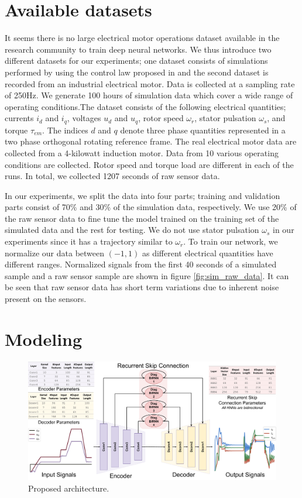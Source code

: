 \documentclass[letterpaper]{article}
\begin{document}
\section{Available datasets}
\label{sec:data}

It seems there is no large electrical motor operations dataset available in the research community to train deep neural networks. We thus introduce two different datasets for our experiments; one dataset consists of simulations performed by using the control law proposed in \cite{jadot2009induct} and the second dataset is recorded from an industrial electrical motor. Data is collected at a sampling rate of 250Hz. We generate 100 hours of simulation data which cover a wide range of operating conditions.The dataset consists of the following electrical quantities; currents $i_{d}$ and $i_{q}$, voltages $u_{d}$ and $u_{q}$, rotor speed $\omega_r$, stator pulsation $\omega_s$, and torque $\tau_{em}$. The indices $d$ and $q$ denote three phase quantities represented in a two phase orthogonal rotating reference frame. The real electrical motor data are collected from a 4-kilowatt induction motor. Data from 10 various operating conditions are collected. Rotor speed and torque load are different in each of the runs. In total, we collected 1207 seconds of raw sensor data.

In our experiments, we split the data into four parts; training and validation parts consist of 70\% and 30\% of the simulation data, respectively. We use 20\% of the raw sensor data to fine tune the model trained on the training set of the simulated data and the rest for testing. We do not use stator pulsation $\omega_s$ in our experiments since it has a trajectory similar to $\omega_r$. To train our network, we normalize our data between $(-1,1)$ as different electrical quantities have different ranges. Normalized signals from the first 40 seconds of a simulated sample and a raw sensor sample are shown in figure \ref{fig:sim_raw_data}. It can be seen that raw sensor data has short term variations due to inherent noise present on the sensors.


\section{Modeling}
\label{sec:modeling}
\begin{figure}[t]
    \centering
    \includegraphics[scale=0.265]{encoder_decoder.pdf}
    \caption{Proposed architecture.}
    \label{fig:arch}
\end{figure}
\end{document}
